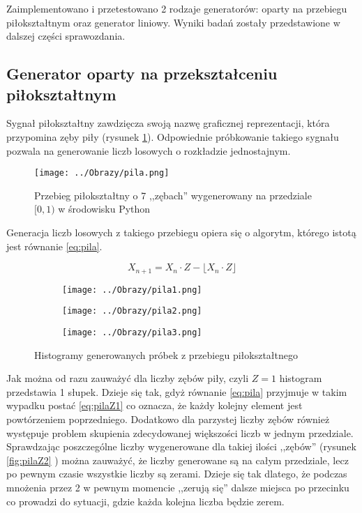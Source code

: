 \documentclass[12pt,a4paper]{article}
\begin{document}
Zaimplementowano i przetestowano 2 rodzaje generatorów: oparty na przebiegu piłokształtnym oraz generator liniowy. 
Wyniki badań zostały przedstawione w dalszej części sprawozdania.

\subsection{Generator oparty na przekształceniu piłokształtnym}
Sygnał piłokształtny zawdzięcza swoją nazwę graficznej reprezentacji, która przypomina zęby piły (rysunek \ref{fig:pila}). Odpowiednie próbkowanie takiego sygnału pozwala na generowanie liczb losowych o rozkładzie jednostajnym.
\begin{figure}[!h]
\centering
\texttt{[image: ../Obrazy/pila.png]} 
\caption{Przebieg piłokształtny o 7 ,,zębach'' wygenerowany na przedziale $[0,1)$ w środowisku Python}
\label{fig:pila}
\end{figure}

Generacja liczb losowych z takiego przebiegu opiera się o algorytm, którego istotą jest równanie \ref{eq:pila}. 


\begin{equation}\label{eq:pila}
X_{n+1} = X_{n} \cdot Z - \lfloor X_{n} \cdot Z \rfloor
\end{equation}

\begin{figure}[H]
\centering
\begin{subfigure}{\textwidth}
\texttt{[image: ../Obrazy/pila1.png]} 
\end{subfigure}
\begin{subfigure}{\textwidth}
\texttt{[image: ../Obrazy/pila2.png]} 
\end{subfigure}
\begin{subfigure}{\textwidth}
\texttt{[image: ../Obrazy/pila3.png]} 
\end{subfigure}
\caption{Histogramy generowanych próbek z przebiegu piłokształtnego}
\label{fig:pila1}
\end{figure}

Jak można od razu zauważyć dla liczby zębów piły, czyli $Z=1$ histogram przedstawia 1 słupek.
Dzieje się tak, gdyż równanie \ref{eq:pila} przyjmuje w takim wypadku postać \ref{eq:pilaZ1} co oznacza, że każdy kolejny element jest powtórzeniem poprzedniego.
Dodatkowo dla parzystej liczby zębów również występuje problem skupienia zdecydowanej większości liczb w jednym przedziale.
Sprawdzając poszczególne liczby wygenerowane dla takiej ilości ,,zębów'' (rysunek \ref{fig:pilaZ2} ) można zauważyć, że liczby generowane są na całym przedziale, lecz po pewnym czasie wszystkie liczby są zerami. Dzieje się tak dlatego, że podczas mnożenia przez 2 w pewnym momencie ,,zerują się'' dalsze miejsca po przecinku co prowadzi do sytuacji, gdzie każda kolejna liczba będzie zerem.
\end{document}
